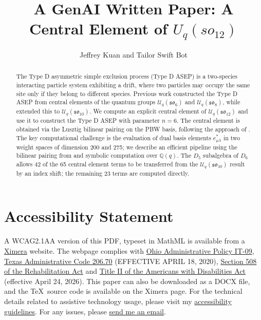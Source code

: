 \documentclass{ximera}
\title{A GenAI Written Paper: A Central Element of \(U_q(so_{12})\)}
\date{}
\author{Jeffrey Kuan and Tailor Swift Bot}
\newcommand{\so}{\mathfrak{so}}
\newcommand{\Uq}{\mathcal{U}_q}
\begin{document}
\begin{abstract}
    The Type D asymmetric simple exclusion process (Type D ASEP) is a two-species interacting particle system exhibiting a drift, where two particles may occupy the same site only if they belong to different species. Previous work \cite{kuan2020} constructed the Type D ASEP from central elements of the quantum groups $\Uq(\so_6)$ and $\Uq(\so_8)$, while \cite{RohrSellakumaranYin} extended this to $\Uq(\so_{10})$. We compute an explicit central element of $\Uq(\so_{12})$ and use it to construct the Type D ASEP with parameter $n = 6$. The central element is obtained via the Lusztig bilinear pairing on the PBW basis, following the approach of \cite{Kuan_2016, kuan2020}. The key computational challenge is the evaluation of dual basis elements $e^*_{\mu\lambda}$ in two weight spaces of dimension 200 and 275; we describe an efficient pipeline using the bilinear pairing from \cite[Chapter~6]{Jan95} and symbolic computation over $\mathbb{Q}(q)$. The $D_5$ subalgebra of $D_6$ allows 42 of the 65 central element terms to be transferred from the $\Uq(\so_{10})$ result by an index shift; the remaining 23 terms are computed directly.
\end{abstract}

\maketitle


\section*{Accessibility Statement}
A WCAG2.1AA version of this PDF, typeset in MathML is available from a \href{https://xerxes.ximera.org/jeffrey-kuan-genaipaper/paper_so12_v3_mathml.html}{Ximera} website. The webpage complies with \href{https://das.ohio.gov/technology-and-strategy/policies/it-09}{Ohio Administrative Policy IT-09}, \href{https://texas-sos.appianportalsgov.com/rules-and-meetings?$locale=en_US&interface=VIEW_TAC_SUMMARY&queryAsDate=11\%2F29\%2F2025&recordId=187750}{Texas Administrative Code 206.70} (EFFECTIVE APRIL 18, 2020), \href{https://www.section508.gov/develop/applicability-conformance/}{Section 508 of the Rehabilitation Act} and \href{https://www.ada.gov/resources/2024-03-08-web-rule/}{Title II of the Americans with Disabilities Act} (effective April 24, 2026). This paper can also be downloaded as a DOCX file, and the \TeX\ source code is available on the Ximera page. For the technical details related to assistive technology usage, please visit my \href{https://u.osu.edu/mathaccessibility/}{accessibility guidelines}. For any issues, please \href{mailto:kuan.44@osu.edu}{send me an email}.
\end{document}
